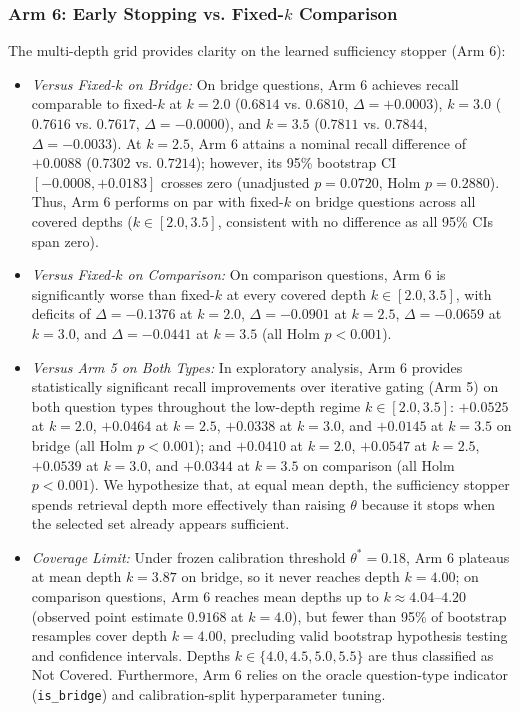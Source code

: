 \documentclass[conference]{IEEEtran}
\begin{document}
\subsubsection{Arm 6: Early Stopping vs. Fixed-$k$ Comparison}
The multi-depth grid provides clarity on the learned sufficiency stopper (Arm 6):
\begin{itemize}
    \item \textit{Versus Fixed-$k$ on Bridge:} On bridge questions, Arm 6 achieves recall comparable to fixed-$k$ at $k=2.0$ ($0.6814$ vs. $0.6810$, $\Delta = +0.0003$), $k=3.0$ ($0.7616$ vs. $0.7617$, $\Delta = -0.0000$), and $k=3.5$ ($0.7811$ vs. $0.7844$, $\Delta = -0.0033$). At $k=2.5$, Arm 6 attains a nominal recall difference of $+0.0088$ ($0.7302$ vs. $0.7214$); however, its 95\% bootstrap CI $[-0.0008, +0.0183]$ crosses zero (unadjusted $p=0.0720$, Holm $p=0.2880$). Thus, Arm 6 performs on par with fixed-$k$ on bridge questions across all covered depths ($k \in [2.0, 3.5]$, consistent with no difference as all 95\% CIs span zero).
    \item \textit{Versus Fixed-$k$ on Comparison:} On comparison questions, Arm 6 is significantly worse than fixed-$k$ at every covered depth $k \in [2.0, 3.5]$, with deficits of $\Delta = -0.1376$ at $k=2.0$, $\Delta = -0.0901$ at $k=2.5$, $\Delta = -0.0659$ at $k=3.0$, and $\Delta = -0.0441$ at $k=3.5$ (all Holm $p < 0.001$).
    \item \textit{Versus Arm 5 on Both Types:} In exploratory analysis, Arm 6 provides statistically significant recall improvements over iterative gating (Arm 5) on both question types throughout the low-depth regime $k \in [2.0, 3.5]$: $+0.0525$ at $k=2.0$, $+0.0464$ at $k=2.5$, $+0.0338$ at $k=3.0$, and $+0.0145$ at $k=3.5$ on bridge (all Holm $p < 0.001$); and $+0.0410$ at $k=2.0$, $+0.0547$ at $k=2.5$, $+0.0539$ at $k=3.0$, and $+0.0344$ at $k=3.5$ on comparison (all Holm $p < 0.001$). We hypothesize that, at equal mean depth, the sufficiency stopper spends retrieval depth more effectively than raising $\theta$ because it stops when the selected set already appears sufficient.
    \item \textit{Coverage Limit:} Under frozen calibration threshold $\theta^*=0.18$, Arm 6 plateaus at mean depth $k=3.87$ on bridge, so it never reaches depth $k=4.00$; on comparison questions, Arm 6 reaches mean depths up to $k \approx 4.04\text{--}4.20$ (observed point estimate $0.9168$ at $k=4.0$), but fewer than 95\% of bootstrap resamples cover depth $k=4.00$, precluding valid bootstrap hypothesis testing and confidence intervals. Depths $k \in \{4.0, 4.5, 5.0, 5.5\}$ are thus classified as Not Covered. Furthermore, Arm 6 relies on the oracle question-type indicator (\texttt{is\_bridge}) and calibration-split hyperparameter tuning.
\end{itemize}
\end{document}
